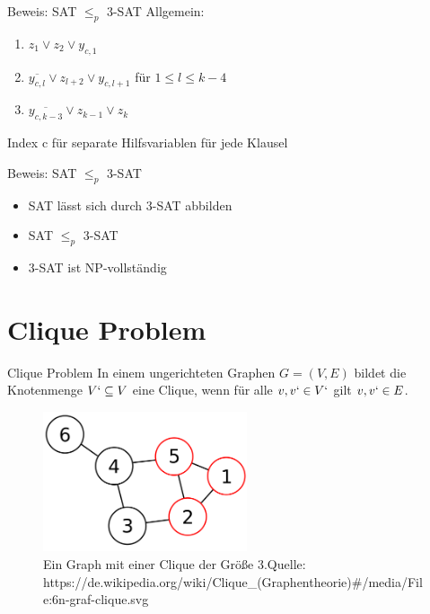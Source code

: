 \documentclass[12pt,handout,notes=dontshow,xcolor=table]{beamer}
\begin{document}
\begin{frame}{Beweis: SAT \(\leq_p\) 3-SAT}
Allgemein:
\begin{enumerate}
\item $z_1 \vee z_2 \vee y_{c,1}$
\item $\overline{y_{c,l}} \vee z_{l+2} \vee y_{c,l+1}$ für $1 \le l \le k - 4$
\item $\overline{y_{c,k-3}} \vee z_{k-1} \vee z_k$
\end{enumerate}
Index c für separate Hilfsvariablen für jede Klausel
\end{frame}

\begin{frame}{Beweis: SAT \(\leq_p\) 3-SAT}
\begin{itemize}
\item SAT lässt sich durch 3-SAT abbilden
\item SAT \(\leq_p\) 3-SAT
\item 3-SAT ist NP-vollständig
\end{itemize}
\end{frame}

\section{Clique Problem}
\begin{frame}{Clique Problem}
In einem ungerichteten Graphen $G = (V,E)$ bildet die Knotenmenge $V` \subseteq V$ eine Clique, wenn für alle $v, v` \in V`$ gilt ${v,v`} \in E$. \cite{wegener}
\pause
\begin{figure}
\includegraphics[width=6cm]{figures/clique1.png}
\caption{Ein Graph mit einer Clique der Größe 3.\newline \newline \tiny Quelle: https://de.wikipedia.org/wiki/Clique\_(Graphentheorie)\#/media/File:6n-graf-clique.svg}
\end{figure}
\end{frame}
\end{document}

